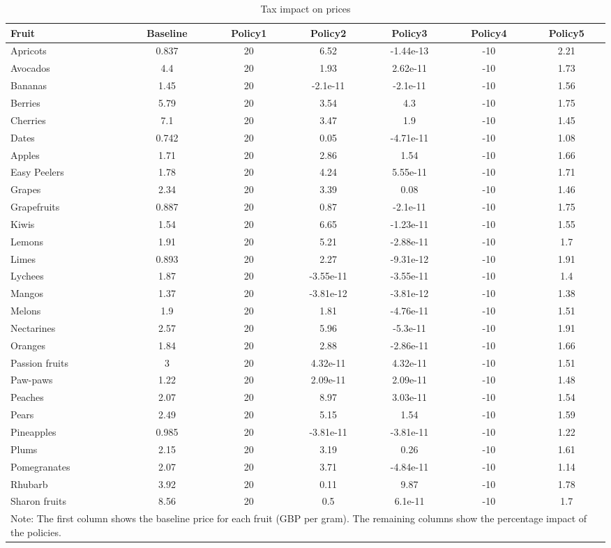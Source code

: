 \documentclass[11pt]{article}
\begin{document}
\begin{table}[h]
\caption{Tax impact on prices}
\label{table:tax impact 2}
\begin{center}
\begin{tabular}{lcccccc} \hline \hline
Fruit & Baseline & Policy1 & Policy2 & Policy3 & Policy4 & Policy5 \\ \hline
Apricots &0.837 &20 &6.52 &-1.44e-13 &-10 &2.21 \\
Avocados &4.4 &20 &1.93 &2.62e-11 &-10 &1.73 \\
Bananas &1.45 &20 &-2.1e-11 &-2.1e-11 &-10 &1.56 \\
Berries &5.79 &20 &3.54 &4.3 &-10 &1.75 \\
Cherries &7.1 &20 &3.47 &1.9 &-10 &1.45 \\
\hline
Dates &0.742 &20 &0.05 &-4.71e-11 &-10 &1.08 \\
Apples &1.71 &20 &2.86 &1.54 &-10 &1.66 \\
Easy Peelers &1.78 &20 &4.24 &5.55e-11 &-10 &1.71 \\
Grapes &2.34 &20 &3.39 &0.08 &-10 &1.46 \\
Grapefruits &0.887 &20 &0.87 &-2.1e-11 &-10 &1.75 \\
\hline
Kiwis &1.54 &20 &6.65 &-1.23e-11 &-10 &1.55 \\
Lemons &1.91 &20 &5.21 &-2.88e-11 &-10 &1.7 \\
Limes &0.893 &20 &2.27 &-9.31e-12 &-10 &1.91 \\
Lychees &1.87 &20 &-3.55e-11 &-3.55e-11 &-10 &1.4 \\
Mangos &1.37 &20 &-3.81e-12 &-3.81e-12 &-10 &1.38 \\
\hline
Melons &1.9 &20 &1.81 &-4.76e-11 &-10 &1.51 \\
Nectarines &2.57 &20 &5.96 &-5.3e-11 &-10 &1.91 \\
Oranges &1.84 &20 &2.88 &-2.86e-11 &-10 &1.66 \\
Passion fruits &3 &20 &4.32e-11 &4.32e-11 &-10 &1.51 \\
Paw-paws &1.22 &20 &2.09e-11 &2.09e-11 &-10 &1.48 \\
\hline
Peaches &2.07 &20 &8.97 &3.03e-11 &-10 &1.54 \\
Pears &2.49 &20 &5.15 &1.54 &-10 &1.59 \\
Pineapples &0.985 &20 &-3.81e-11 &-3.81e-11 &-10 &1.22 \\
Plums &2.15 &20 &3.19 &0.26 &-10 &1.61 \\
Pomegranates &2.07 &20 &3.71 &-4.84e-11 &-10 &1.14 \\
\hline
Rhubarb &3.92 &20 &0.11 &9.87 &-10 &1.78 \\
Sharon fruits &8.56 &20 &0.5 &6.1e-11 &-10 &1.7 \\
 \hline \hline
\multicolumn{7}{p{0.8 \textwidth}}{Note: The first column shows the baseline price for each fruit (GBP per gram). The remaining columns show the percentage impact of the policies.}
\end{tabular}
\end{center}
\end{table}
\end{document}
